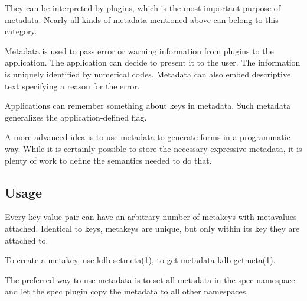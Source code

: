 \begin{DoxyItemize}
\item They can be interpreted by plugins, which is the most important purpose of metadata. Nearly all kinds of metadata mentioned above can belong to this category.
\item Metadata is used to pass error or warning information from plugins to the application. The application can decide to present it to the user. The information is uniquely identified by numerical codes. Metadata can also embed descriptive text specifying a reason for the error.
\item Applications can remember something about keys in metadata. Such metadata generalizes the application-\/defined flag.
\item A more advanced idea is to use metadata to generate forms in a programmatic way. While it is certainly possible to store the necessary expressive metadata, it is plenty of work to define the semantics needed to do that.
\end{DoxyItemize}

\subsection*{Usage}

Every key-\/value pair can have an arbitrary number of metakeys with metavalues attached. Identical to keys, metakeys are unique, but only within its key they are attached to.

To create a metakey, use \hyperlink{doc_help_kdb-setmeta_md}{kdb-\/setmeta(1)}, to get metadata \hyperlink{doc_help_kdb-getmeta_md}{kdb-\/getmeta(1)}.

The preferred way to use metadata is to set all metadata in the {\ttfamily spec} namespace and let the {\ttfamily spec} plugin copy the metadata to all other namespaces. 